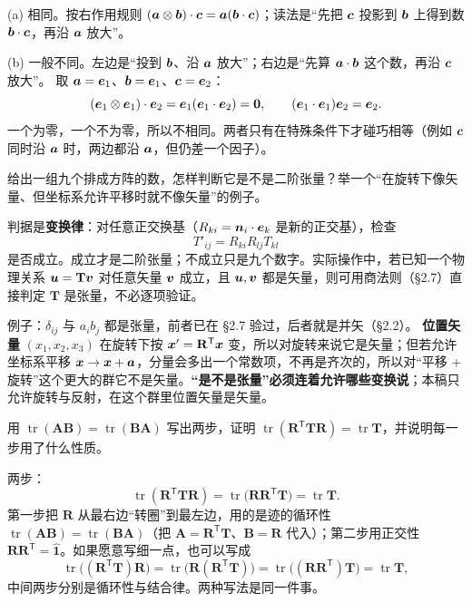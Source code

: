 \documentclass[11pt]{ctexart}
\newcommand{\ten}[1]{\mathbf{#1}}
\newcommand{\unitd}{\hat{\ten{1}}}
\newcommand{\tr}{\operatorname{tr}}
\begin{document}
(a) 相同。按右作用规则 $(\boldsymbol{a}\otimes\boldsymbol{b})\cdot\boldsymbol{c}=\boldsymbol{a}(\boldsymbol{b}\cdot\boldsymbol{c})$；读法是“先把 $\boldsymbol{c}$ 投影到 $\boldsymbol{b}$ 上得到数 $\boldsymbol{b}\cdot\boldsymbol{c}$，再沿 $\boldsymbol{a}$ 放大”。

(b) 一般不同。左边是“投到 $\boldsymbol{b}$、沿 $\boldsymbol{a}$ 放大”；右边是“先算 $\boldsymbol{a}\cdot\boldsymbol{b}$ 这个数，再沿 $\boldsymbol{c}$ 放大”。
取 $\boldsymbol{a}=\boldsymbol{e}_1$、$\boldsymbol{b}=\boldsymbol{e}_1$、$\boldsymbol{c}=\boldsymbol{e}_2$：
\[
(\boldsymbol{e}_1\otimes\boldsymbol{e}_1)\cdot\boldsymbol{e}_2=\boldsymbol{e}_1(\boldsymbol{e}_1\cdot\boldsymbol{e}_2)=\boldsymbol{0},
\qquad
(\boldsymbol{e}_1\cdot\boldsymbol{e}_1)\boldsymbol{e}_2=\boldsymbol{e}_2 .
\]
一个为零，一个不为零，所以不相同。两者只有在特殊条件下才碰巧相等（例如 $\boldsymbol{c}$ 同时沿 $\boldsymbol{a}$ 时，两边都沿 $\boldsymbol{a}$，但仍差一个因子）。

{给出一组九个排成方阵的数，怎样判断它是不是二阶张量？举一个“在旋转下像矢量、但坐标系允许平移时就不像矢量”的例子。}

判据是\textbf{变换律}：对任意正交换基（$R_{ki}=\boldsymbol{n}_i\cdot\boldsymbol{e}_k$ 是新的正交基），检查
\[
T'_{ij}=R_{ki}R_{lj}T_{kl}
\]
是否成立。成立才是二阶张量；不成立只是九个数字。实际操作中，若已知一个物理关系 $\vect u=\ten T\vect v$ 对任意矢量 $\boldsymbol{v}$ 成立，且 $\boldsymbol{u},\boldsymbol{v}$ 都是矢量，则可用商法则（§2.7）直接判定 $\ten T$ 是张量，不必逐项验证。

例子：$\delta_{ij}$ 与 $a_ib_j$ 都是张量，前者已在 §2.7 验过，后者就是并矢（§2.2）。
\textbf{位置矢量} $(x_1,x_2,x_3)$ 在旋转下按 $\vect x'=\ten R^{\mathsf T}\vect x$ 变，所以对旋转来说它是矢量；但若允许坐标系平移 $\boldsymbol{x}\to\boldsymbol{x}+\boldsymbol{a}$，分量会多出一个常数项，不再是齐次的，所以对“平移 + 旋转”这个更大的群它不是矢量。\textbf{“是不是张量”必须连着允许哪些变换说}；本稿只允许旋转与反射，在这个群里位置矢量是矢量。

{用 $\tr(\ten A\ten B)=\tr(\ten B\ten A)$ 写出两步，证明 $\tr(\ten R^{\mathsf T}\ten T\ten R)=\tr\ten T$，并说明每一步用了什么性质。}

两步：
\[
\tr(\ten R^{\mathsf T}\ten T\ten R)
=\tr\bigl(\ten R\ten R^{\mathsf T}\ten T\bigr)
=\tr\ten T .
\]
第一步把 $\ten R$ 从最右边“转圈”到最左边，用的是迹的循环性 $\tr(\ten A\ten B)=\tr(\ten B\ten A)$（把 $\ten A=\ten R^{\mathsf T}\ten T$、$\ten B=\ten R$ 代入）；第二步用正交性 $\ten R\ten R^{\mathsf T}=\unitd$。如果愿意写细一点，也可以写成
\[
\tr\bigl((\ten R^{\mathsf T}\ten T)\ten R\bigr)
=\tr\bigl(\ten R(\ten R^{\mathsf T}\ten T)\bigr)
=\tr\bigl((\ten R\ten R^{\mathsf T})\ten T\bigr)
=\tr\ten T,
\]
中间两步分别是循环性与结合律。两种写法是同一件事。
\end{document}
